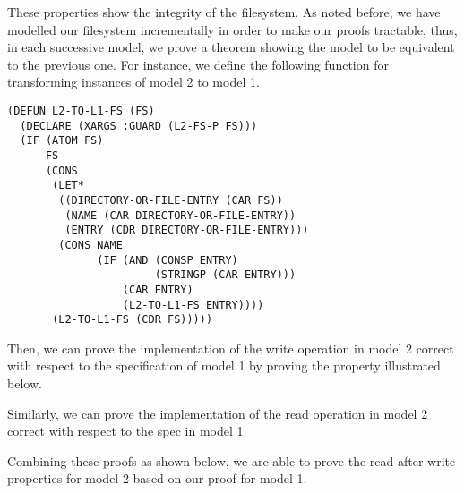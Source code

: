 \documentclass[format=sigconf,review=true]{acmart}
\begin{document}
These properties show the integrity of the filesystem. As noted
before, we have modelled our filesystem incrementally in order to make
our proofs tractable, thus, in each successive model, we prove a
theorem showing the model to be equivalent to the previous one. For
instance, we define the following function for transforming
instances of model 2 to model 1.

\begin{lstlisting}
(DEFUN L2-TO-L1-FS (FS)
  (DECLARE (XARGS :GUARD (L2-FS-P FS)))
  (IF (ATOM FS)
      FS
      (CONS
       (LET*
        ((DIRECTORY-OR-FILE-ENTRY (CAR FS))
         (NAME (CAR DIRECTORY-OR-FILE-ENTRY))
         (ENTRY (CDR DIRECTORY-OR-FILE-ENTRY)))
        (CONS NAME
              (IF (AND (CONSP ENTRY)
                       (STRINGP (CAR ENTRY)))
                  (CAR ENTRY)
                  (L2-TO-L1-FS ENTRY))))
       (L2-TO-L1-FS (CDR FS)))))
\end{lstlisting}

Then, we can prove the implementation of the write operation in model
2 correct with respect to the specification of model 1 by proving the
property illustrated below.


Similarly, we can prove the implementation of the read operation in
model 2 correct with respect to the spec in model 1.


Combining these proofs as shown below, we are able to prove the read-after-write
properties for model 2 based on our proof for model 1.
\end{document}
